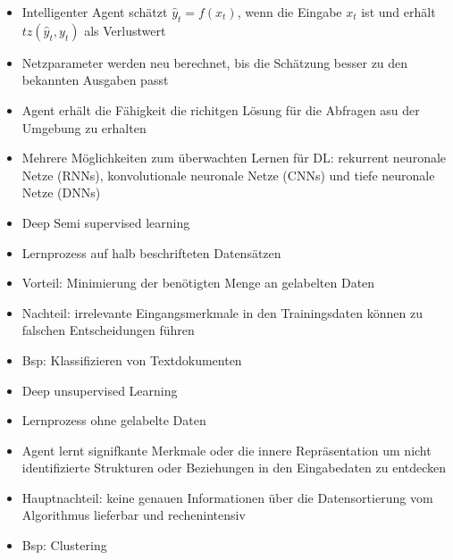 \begin{itemize}
\begin{itemize}
        \item Intelligenter Agent schätzt $\hat{y}_t = f(x_t)$, wenn die Eingabe $x_t$ ist und erhält $tz(\hat{y}_t, y_t)$ als Verlustwert
        \item Netzparameter werden neu berechnet, bis die Schätzung besser zu den bekannten Ausgaben passt
        \item Agent erhält die Fähigkeit die richitgen Lösung für die Abfragen asu der Umgebung zu erhalten
        \item Mehrere Möglichkeiten zum überwachten Lernen für DL: rekurrent neuronale Netze (RNNs), konvolutionale neuronale Netze (CNNs) und tiefe neuronale Netze (DNNs)
    \end{itemize}
    \begin{itemize}
        \item Deep Semi supervised learning
        \item Lernprozess auf halb beschrifteten Datensätzen
        \item Vorteil: Minimierung der benötigten Menge an gelabelten Daten
        \item Nachteil: irrelevante Eingangsmerkmale in den Trainingsdaten können zu falschen Entscheidungen führen
        \item Bsp: Klassifizieren von Textdokumenten
    \end{itemize}
    \begin{itemize}
        \item Deep unsupervised Learning
        \item Lernprozess ohne gelabelte Daten
        \item Agent lernt signifkante Merkmale oder die innere Repräsentation um nicht identifizierte Strukturen oder Beziehungen in den Eingabedaten zu entdecken
        \item Hauptnachteil: keine genauen Informationen über die Datensortierung vom Algorithmus lieferbar und rechenintensiv 
        \item Bsp: Clustering
    \end{itemize}
    

\end{itemize}

